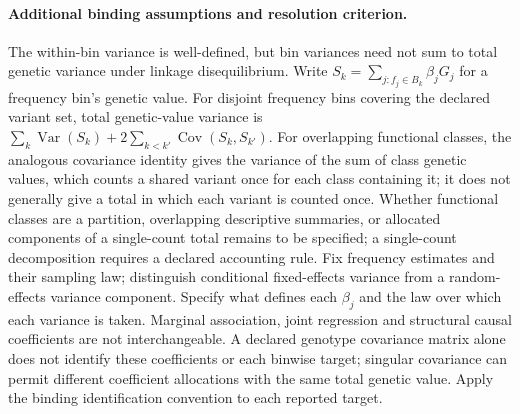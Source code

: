 \documentclass[11pt]{article}
\begin{document}
\paragraph{Additional binding assumptions and resolution criterion.} The within-bin variance is well-defined, but bin variances need not sum to total genetic variance under linkage disequilibrium. Write $S_k=\sum_{j:f_j\in B_k}\beta_jG_j$ for a frequency bin's genetic value. For disjoint frequency bins covering the declared variant set, total genetic-value variance is $\sum_k\operatorname{Var}(S_k)+2\sum_{k<k'}\operatorname{Cov}(S_k,S_{k'})$. For overlapping functional classes, the analogous covariance identity gives the variance of the sum of class genetic values, which counts a shared variant once for each class containing it; it does not generally give a total in which each variant is counted once. Whether functional classes are a partition, overlapping descriptive summaries, or allocated components of a single-count total remains to be specified; a single-count decomposition requires a declared accounting rule. Fix frequency estimates and their sampling law; distinguish conditional fixed-effects variance from a random-effects variance component. Specify what defines each $\beta_j$ and the law over which each variance is taken. Marginal association, joint regression and structural causal coefficients are not interchangeable. A declared genotype covariance matrix alone does not identify these coefficients or each binwise target; singular covariance can permit different coefficient allocations with the same total genetic value. Apply the binding identification convention to each reported target.
\end{document}
